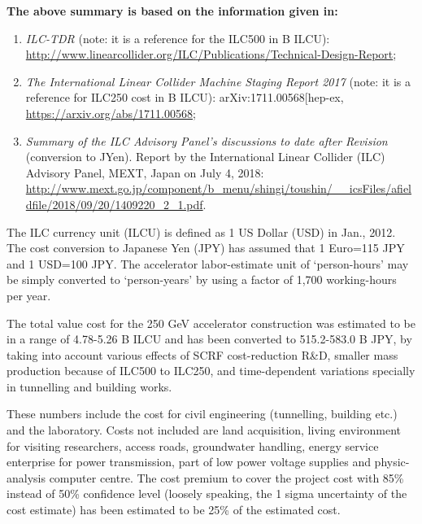 \documentclass[%
reprint,
 floatfix,
 amsmath,amssymb,
 aps,
]{revtex4-1}
\begin{document}
\textbf{The above summary is based on the information given in:} 
\begin{enumerate}
\item 
\textit{ILC-TDR} (note: it is a reference for the ILC500 in B ILCU): \url{http://www.linearcollider.org/ILC/Publications/Technical-Design-Report};
\item
\textit{The International Linear Collider Machine Staging Report 2017} (note: it is a reference for ILC250 cost in B ILCU): arXiv:1711.00568[hep-ex, \url{https://arxiv.org/abs/1711.00568};
\item
\textit{Summary of the ILC Advisory Panel's discussions to date after Revision} (conversion to JYen). Report by the International Linear Collider (ILC) Advisory Panel, MEXT, Japan on July 4, 2018: \url{http://www.mext.go.jp/component/b\_menu/shingi/toushin/\_\_icsFiles/afieldfile/2018/09/20/1409220\_2\_1.pdf}.
\end{enumerate}
 
The ILC currency unit (ILCU) is defined as 1 US Dollar (USD) in Jan., 2012. The cost conversion to Japanese Yen (JPY) has assumed that 1 Euro=115 JPY and 1 USD=100 JPY. The accelerator labor-estimate unit of ‘person-hours’ may be simply converted to ‘person-years’ by using a factor of 1,700 working-hours per year.

The total value cost for the 250 GeV accelerator construction was estimated to be in a range of 4.78-5.26 B ILCU and has been converted to 515.2-583.0 B JPY, by taking into account various effects of SCRF cost-reduction R\&D, smaller mass production because of ILC500 to ILC250, and time-dependent variations specially in tunnelling and building works. 

These numbers include the cost for civil engineering (tunnelling, building etc.) and the laboratory. Costs not included are land acquisition, living environment for visiting researchers, access roads, groundwater handling, energy service enterprise for power transmission, part of low power voltage supplies and physic-analysis computer centre. The cost premium to cover the project cost with 85\% instead of 50\% confidence level (loosely speaking, the 1 sigma  uncertainty of the cost estimate) has been estimated to be 25\% of the estimated cost.


\end{document}

